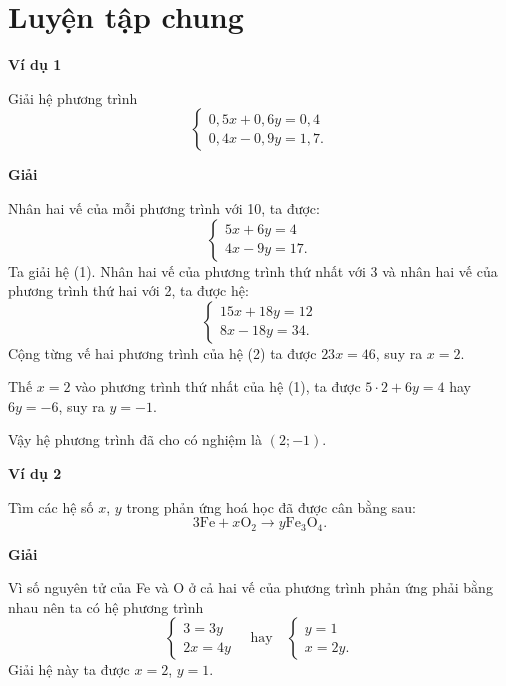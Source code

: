 
\section*{Luyện tập chung}

\begin{lesson}
    \textbf{Ví dụ 1}

    Giải hệ phương trình
    \[
        \begin{cases}
            0{,}5x+0{,}6y=0{,}4\\
            0{,}4x-0{,}9y=1{,}7.
        \end{cases}
    \]

    \textbf{Giải}

    Nhân hai vế của mỗi phương trình với 10, ta được:
    \[
        \begin{cases}
            5x+6y=4\\
            4x-9y=17.
        \end{cases}
        \tag{1}
    \]
    Ta giải hệ (1). Nhân hai vế của phương trình thứ nhất với 3 và nhân hai vế của phương trình thứ hai với 2, ta được hệ:
    \[
        \begin{cases}
            15x+18y=12\\
            8x-18y=34.
        \end{cases}
        \tag{2}
    \]
    Cộng từng vế hai phương trình của hệ (2) ta được $23x=46$, suy ra $x=2$.

    Thế $x=2$ vào phương trình thứ nhất của hệ (1), ta được $5\cdot2+6y=4$ hay $6y=-6$, suy ra $y=-1$.

    Vậy hệ phương trình đã cho có nghiệm là $(2;-1)$.

    \textbf{Ví dụ 2}

    Tìm các hệ số $x$, $y$ trong phản ứng hoá học đã được cân bằng sau:
    \[
        3\mathrm{Fe}+x\mathrm{O}_2\rightarrow y\mathrm{Fe}_3\mathrm{O}_4.
    \]

    \textbf{Giải}

    Vì số nguyên tử của Fe và O ở cả hai vế của phương trình phản ứng phải bằng nhau nên ta có hệ phương trình
    \[
        \begin{cases}
            3=3y\\
            2x=4y
        \end{cases}
        \quad\text{hay}\quad
        \begin{cases}
            y=1\\
            x=2y.
        \end{cases}
    \]
    Giải hệ này ta được $x=2$, $y=1$.


\end{lesson}

